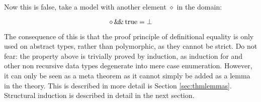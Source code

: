 Now this is false, take a model with another element $\diamond$ in the
domain:

$$\diamond \, \mathrm{\&\!\&} \, \mathrm{true} = \bot$$

The consequence of this is that the proof principle of definitional
equality is only used on abstract types, rather than polymorphic, as
they cannot be strict. Do not fear: the property above is trivially
proved by induction, as induction for  and other non
recursive data types degenerate into mere case enumeration. However,
it can only be seen as a meta theorem as it cannot simply be added as
a lemma in the theory. This is described in more detail is Section
\ref{sec:thmlemmas}. Structural induction is described in detail in
the next section.


